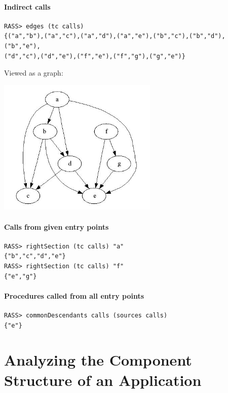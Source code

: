\documentclass[11pt]{article}
\begin{document}
\paragraph{Indirect calls} 

\begin{verbatim}
RASS> edges (tc calls)
{("a","b"),("a","c"),("a","d"),("a","e"),("b","c"),("b","d"),("b","e"),
("d","c"),("d","e"),("f","e"),("f","g"),("g","e")}
\end{verbatim}

Viewed as a graph: 

\begin{center}
\includegraphics[width=3in]{tcalls}
\end{center}


\paragraph{Calls from given entry points} 

\begin{verbatim}
RASS> rightSection (tc calls) "a"
{"b","c","d","e"}
RASS> rightSection (tc calls) "f"
{"e","g"}
\end{verbatim}

\paragraph{Procedures called from all entry points} \mbox{}

\begin{verbatim}
RASS> commonDescendants calls (sources calls)
{"e"}
\end{verbatim}

\section{Analyzing the Component Structure of an Application} 
\end{document}
